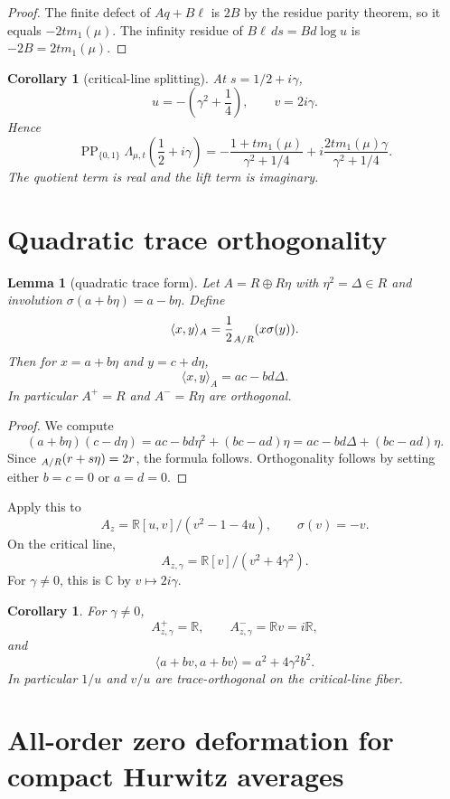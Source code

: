 \documentclass[11pt]{article}
\newtheorem{lemma}[theorem]{Lemma}
\newtheorem{corollary}[theorem]{Corollary}
\let\Tr\relax
\DeclareMathOperator{\Tr}{Tr}
\newcommand{\C}{\mathbb C}
\newcommand{\R}{\mathbb R}
\newcommand{\PP}{\operatorname{PP}}
\begin{document}
\begin{proof}
The finite defect of $Aq+B\ell$ is $2B$ by the residue parity theorem, so it equals
$-2tm_1(\mu)$.  The infinity residue of $B\ell\,ds=Bd\log u$ is $-2B=2tm_1(\mu)$.
\end{proof}

\begin{corollary}[critical-line splitting]
At $s=1/2+i\gamma$,
\[
u=-\left(\gamma^2+\frac14\right),
\qquad
v=2i\gamma.
\]
Hence
\[
\PP_{\{0,1\}}\Lambda_{\mu,t}\left(\frac12+i\gamma\right)
=-\frac{1+t m_1(\mu)}{\gamma^2+1/4}
+i\frac{2t m_1(\mu)\gamma}{\gamma^2+1/4}.
\]
The quotient term is real and the lift term is imaginary.
\end{corollary}

\section{Quadratic trace orthogonality}

\begin{lemma}[quadratic trace form]
Let $A=R\oplus R\eta$ with $\eta^2=\Delta\in R$ and involution
$\sigma(a+b\eta)=a-b\eta$.  Define
\[
\langle x,y\rangle_A=\frac12\Tr_{A/R}(x\sigma(y)).
\]
Then for $x=a+b\eta$ and $y=c+d\eta$,
\[
\langle x,y\rangle_A=ac-bd\Delta.
\]
In particular $A^+=R$ and $A^-=R\eta$ are orthogonal.
\end{lemma}

\begin{proof}
We compute
\[
(a+b\eta)(c-d\eta)=ac-bd\eta^2+(bc-ad)\eta=ac-bd\Delta+(bc-ad)\eta.
\]
Since $\Tr_{A/R}(r+s\eta)=2r$, the formula follows.  Orthogonality follows by
setting either $b=c=0$ or $a=d=0$.
\end{proof}

Apply this to
\[
A_z=\R[u,v]/(v^2-1-4u),
\qquad \sigma(v)=-v.
\]
On the critical line,
\[
A_{z,\gamma}=\R[v]/(v^2+4\gamma^2).
\]
For $\gamma\ne0$, this is $\C$ by $v\mapsto 2i\gamma$.

\begin{corollary}
For $\gamma\ne0$,
\[
A_{z,\gamma}^+=\R,
\qquad
A_{z,\gamma}^-=\R v=i\R,
\]
and
\[
\langle a+bv,a+bv\rangle=a^2+4\gamma^2b^2.
\]
In particular $1/u$ and $v/u$ are trace-orthogonal on the critical-line fiber.
\end{corollary}

\section{All-order zero deformation for compact Hurwitz averages}
\end{document}

